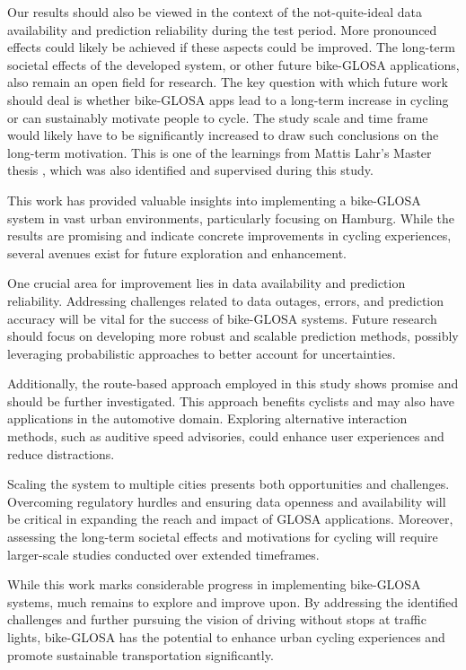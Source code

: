 Our results should also be viewed in the context of the not-quite-ideal data availability and prediction reliability during the test period. More pronounced effects could likely be achieved if these aspects could be improved. The long-term societal effects of the developed system, or other future bike-GLOSA applications, also remain an open field for research. The key question with which future work should deal is whether bike-GLOSA apps lead to a long-term increase in cycling or can sustainably motivate people to cycle. The study scale and time frame would likely have to be significantly increased to draw such conclusions on the long-term motivation. This is one of the learnings from Mattis Lahr's Master thesis \cite{lahr_2023}, which was also identified and supervised during this study.

\begin{Summary}[Outlook]
This work has provided valuable insights into implementing a bike-GLOSA system in vast urban environments, particularly focusing on Hamburg. While the results are promising and indicate concrete improvements in cycling experiences, several avenues exist for future exploration and enhancement.

One crucial area for improvement lies in data availability and prediction reliability. Addressing challenges related to data outages, errors, and prediction accuracy will be vital for the success of bike-GLOSA systems. Future research should focus on developing more robust and scalable prediction methods, possibly leveraging probabilistic approaches to better account for uncertainties.

Additionally, the route-based approach employed in this study shows promise and should be further investigated. This approach benefits cyclists and may also have applications in the automotive domain. Exploring alternative interaction methods, such as auditive speed advisories, could enhance user experiences and reduce distractions.

Scaling the system to multiple cities presents both opportunities and challenges. Overcoming regulatory hurdles and ensuring data openness and availability will be critical in expanding the reach and impact of GLOSA applications. Moreover, assessing the long-term societal effects and motivations for cycling will require larger-scale studies conducted over extended timeframes.

While this work marks considerable progress in implementing bike-GLOSA systems, much remains to explore and improve upon. By addressing the identified challenges and further pursuing the vision of driving without stops at traffic lights, bike-GLOSA has the potential to enhance urban cycling experiences and promote sustainable transportation significantly.
\end{Summary}